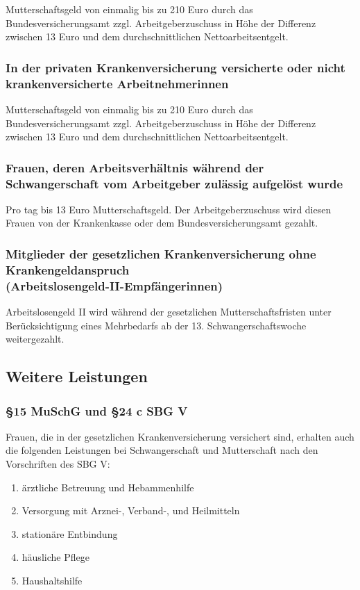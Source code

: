 \documentclass[a4paper, 12pt]{report}
\begin{document}
\begin{multicols}{2}
Mutterschaftsgeld von einmalig bis zu 210 Euro durch das Bundesversicherungsamt
zzgl. Arbeitgeberzuschuss in Höhe der Differenz zwischen 13 Euro und dem
durchschnittlichen Nettoarbeitsentgelt.

\subsubsection{In der privaten Krankenversicherung versicherte oder nicht
krankenversicherte Arbeitnehmerinnen}

Mutterschaftsgeld von einmalig bis zu 210 Euro durch das Bundesversicherungsamt
zzgl. Arbeitgeberzuschuss in Höhe der Differenz zwischen 13 Euro und dem
durchschnittlichen Nettoarbeitsentgelt.

\subsubsection{Frauen, deren Arbeitsverhältnis während der Schwangerschaft vom
Arbeitgeber zulässig aufgelöst wurde}

Pro tag bis 13 Euro Mutterschaftsgeld. Der Arbeitgeberzuschuss wird diesen
Frauen von der Krankenkasse oder dem Bundesversicherungsamt gezahlt.

\subsubsection{Mitglieder der gesetzlichen Krankenversicherung ohne
Krankengeldanspruch \\ (Arbeitslosengeld-II-Empfängerinnen)}

Arbeitslosengeld II wird während der gesetzlichen Mutterschaftsfristen unter
Berücksichtigung eines Mehrbedarfs ab der 13. Schwangerschaftswoche
weitergezahlt.

\subsection{Weitere Leistungen}

\subsubsection{\S 15 MuSchG und \S 24 c SBG V}

Frauen, die in der gesetzlichen Krankenversicherung versichert sind, erhalten
auch die folgenden Leistungen bei Schwangerschaft und Mutterschaft nach den
Vorschriften des SBG V:

\begin{enumerate}
    \item ärztliche Betreuung und Hebammenhilfe
    \item Versorgung mit Arznei-, Verband-, und Heilmitteln
    \item stationäre Entbindung
    \item häusliche Pflege
    \item Haushaltshilfe
\end{enumerate}


\end{multicols}
\end{document}
